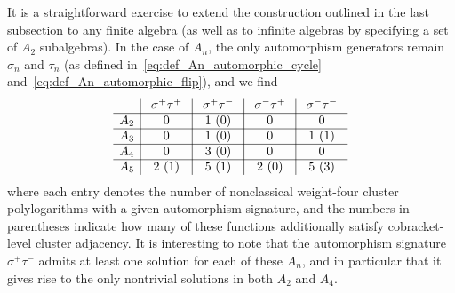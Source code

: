 \documentclass[11pt]{article}
\begin{document}
It is a straightforward exercise to extend the construction outlined in the last subsection to any finite algebra (as well as to infinite algebras by specifying a set of $A_2$ subalgebras). In the case of $A_n$, the only automorphism generators remain $\sigma_n$ and $\tau_n$ (as defined in~\eqref{eq:def_An_automorphic_cycle} and~\eqref{eq:def_An_automorphic_flip}), and we find
\begin{equation}\label{eq:an-func-counts}
\begin{array}{ l | c | c | c | c }			
  &\ \sigma^+\tau^+ \ &\ \sigma^+\tau^- \ & \ \sigma^-\tau^+ \ &\ \sigma^-\tau^- \ \\
  \hline
  A_2 & 0 & 1 \ (0) & 0 & 0 \\  
  \hline
  A_3 & 0 & 1 \ (0) & 0 & 1\ (1) \\  
  \hline
  A_4 & 0 & 3 \ (0) & 0 & 0 \\
  \hline
  A_5 & 2 \ (1) & 5 \ (1) & 2 \ (0) & 5 \ (3) 
\end{array} 
\end{equation}
where each entry denotes the number of nonclassical weight-four cluster polylogarithms with a given automorphism signature, and the numbers in parentheses indicate how many of these functions additionally satisfy cobracket-level cluster adjacency. It is interesting to note that the automorphism signature $\sigma^+\tau^- $ admits at least one solution for each of these $A_n$, and in particular that it gives rise to the only nontrivial solutions in both $A_2$ and $A_4$. 
\end{document}
